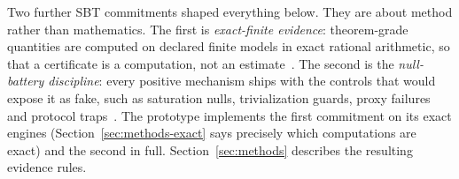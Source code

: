 Two further SBT commitments shaped everything below. They are about method rather than mathematics. The first is \emph{exact-finite evidence}: theorem-grade quantities are computed on declared finite models in exact rational arithmetic, so that a certificate is a computation, not an estimate~\cite{sbt-f3}. The second is the \emph{null-battery discipline}: every positive mechanism ships with the controls that would expose it as fake, such as saturation nulls, trivialization guards, proxy failures and protocol traps~\cite{sbt-ng}. The prototype implements the first commitment on its exact engines (Section~\ref{sec:methods-exact} says precisely which computations are exact) and the second in full. Section~\ref{sec:methods} describes the resulting evidence rules.
